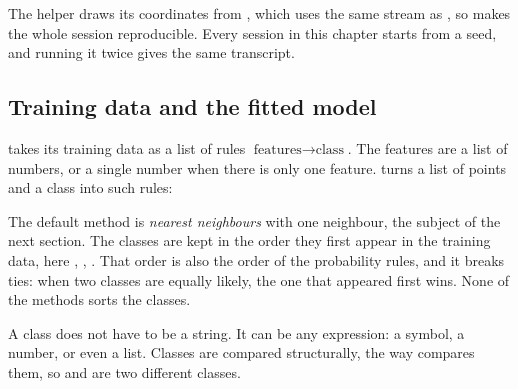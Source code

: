 
The helper  draws its coordinates from , which uses
the same stream as , so  makes the whole session
reproducible. Every session in this chapter starts from a seed, and running it
twice gives the same transcript.

\subsection{Training data and the fitted model}
\label{ssec:ml-data}

 takes its training data as a list of rules
\(\text{features} \to \text{class}\). The features are a list of numbers, or a
single number when there is only one feature.  turns a list of points
and a class into such rules:

\begin{codepairs}
\end{codepairs}

The default method is \emph{nearest neighbours} with one neighbour, the subject of
the next section. The classes are kept in the order they first appear in the
training data, here , , . That order is also the
order of the probability rules, and it breaks ties: when two classes are equally
likely, the one that appeared first wins. None of the methods sorts the classes.

A class does not have to be a string. It can be any expression: a symbol, a number,
or even a list. Classes are compared structurally, the way  compares
them, so  and  are two different classes.

